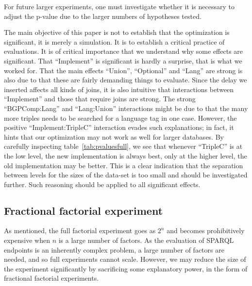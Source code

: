 \documentclass{llncs}
\begin{document}
For future larger experiments, one must investigate whether it is
necessary to adjust the p-value due to the larger numbers of
hypotheses tested.

The main objective of this paper is not to establish that the
optimization is significant, it is merely a simulation. It is to
establish a critical practice of evaluations. It is of critical
importance that we understand why some effects are significant. That
``Implement'' is significant is hardly a surprise, that is what we
worked for. That the main effects ``Union'', ``Optional'' and ``Lang''
are strong is also due to that these are fairly demanding things to
evaluate. Since the delay we inserted affects all kinds of joins, it
is also intuitive that interactions between ``Implement'' and those
that require joins are strong. The strong ``BGPComp:Lang'' and
``Lang:Union'' interactions might be due to that the many more triples
needs to be searched for a language tag in one case. However, the
positive ``Implement:TripleC'' interaction evades such explanations;
in fact, it hints that our optimization may not work as well for
larger databases. By carefully inspecting table~\ref{tab:pvaluesfull},
we see that whenever ``TripleC'' is at the low level, the
new implementation is always best, only at the higher level, the old
implementation may be better. This is a clear indication that the
separation between levels for the sizes of the data-set is too small
and should be investigated further. Such reasoning should be applied
to all significant effects.



\subsection{Fractional factorial experiment}\label{sec:frac}

As mentioned, the full factorial experiment goes as $2^n$ and becomes
prohibitively expensive when $n$ is a large number of factors. As the
evaluation of SPARQL endpoints is an inherently complex problem, a
large number of factors are needed, and so full experiments cannot
scale. However, we may reduce the size of the experiment significantly
by sacrificing some explanatory power, in the form of fractional
factorial experiments.
\end{document}
